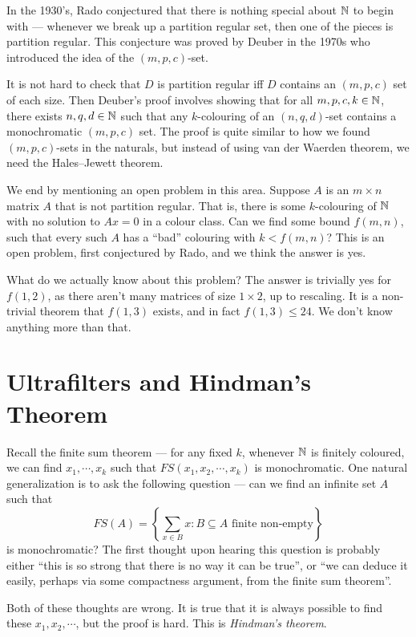 \documentclass[a4paper]{article}
\begin{document}
  In the 1930's, Rado conjectured that there is nothing special about $\mathbb{N}$ to begin with --- whenever we break up a partition regular set, then one of the pieces is partition regular. This conjecture was proved by Deuber in the 1970s who introduced the idea of the $(m, p, c)$-set.

  It is not hard to check that $D$ is partition regular iff $D$ contains an $(m, p, c)$ set of each size. Then Deuber's proof involves showing that for all $m, p, c, k \in \mathbb{N}$, there exists $n, q, d \in \mathbb{N} $ such that any $k$-colouring of an $(n, q, d)$-set contains a monochromatic $(m, p, c)$ set. The proof is quite similar to how we found $(m, p, c)$-sets in the naturals, but instead of using van der Waerden theorem, we need the Hales--Jewett theorem.

  \separator

  We end by mentioning an open problem in this area. Suppose $A$ is an $m \times n $ matrix $A$ that is not partition regular. That is, there is some $k$-colouring of $\mathbb{N}$ with no solution to $Ax = 0$ in a colour class. Can we find some bound $f(m, n)$, such that every such $A$ has a ``bad'' colouring with $k < f(m, n)$? This is an open problem, first conjectured by Rado, and we think the answer is yes.

  What do we actually know about this problem? The answer is trivially yes for $f(1, 2)$, as there aren't many matrices of size $1 \times 2$, up to rescaling. It is a non-trivial theorem that $f(1, 3)$ exists, and in fact $f(1, 3) \leq 24$. We don't know anything more than that.

  \section{Ultrafilters and Hindman's Theorem}
  Recall the finite sum theorem --- for any fixed $k$, whenever $\mathbb{N}$ is finitely coloured, we can find $x_1, \cdots, x_k$ such that $FS(x_1, x_2, \cdots, x_k)$ is monochromatic. One natural generalization is to ask the following question --- can we find an infinite set $A$ such that
  \[
    FS(A) = \left\{\sum_{x \in B} x : B \subseteq A\text{ finite non-empty}\right\}
  \]
  is monochromatic? The first thought upon hearing this question is probably either ``this is so strong that there is no way it can be true'', or ``we can deduce it easily, perhaps via some compactness argument, from the finite sum theorem''.

  Both of these thoughts are wrong. It is true that it is always possible to find these $x_1, x_2, \cdots$, but the proof is hard. This is \emph{Hindman's theorem}.
\end{document}

